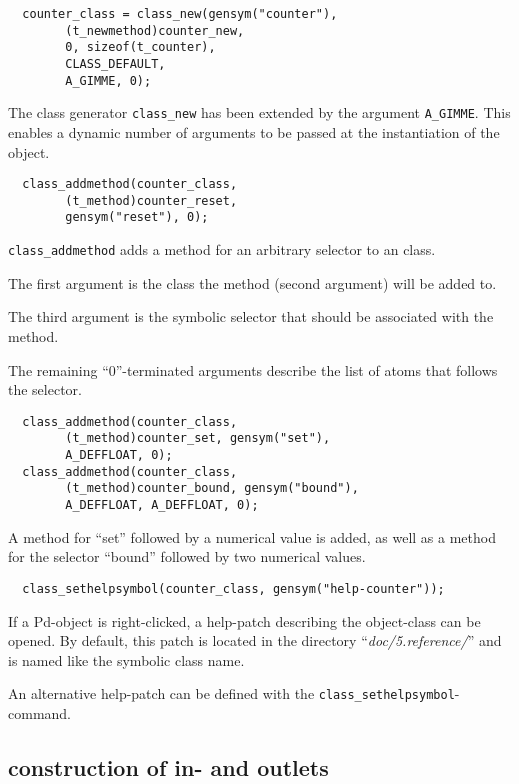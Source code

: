 \documentclass[12pt, a4paper,english,titlepage]{article}
\begin{document}
\begin{verbatim}
  counter_class = class_new(gensym("counter"),
        (t_newmethod)counter_new,
        0, sizeof(t_counter),
        CLASS_DEFAULT, 
        A_GIMME, 0);
\end{verbatim}

The class generator \verb+class_new+ has been extended by the argument \verb+A_GIMME+.
This enables a dynamic number of arguments to be passed at the instantiation of the object.

\begin{verbatim}
  class_addmethod(counter_class,
        (t_method)counter_reset,
        gensym("reset"), 0);
\end{verbatim}

\verb+class_addmethod+ adds a method for an arbitrary selector to an class.

The first argument is the class the method (second argument) will be added to.

The third argument is the symbolic selector that should be associated with the method.

The remaining ``0''-terminated arguments describe the list of atoms that
follows the selector.

\begin{verbatim}
  class_addmethod(counter_class,
        (t_method)counter_set, gensym("set"),
        A_DEFFLOAT, 0);
  class_addmethod(counter_class,
        (t_method)counter_bound, gensym("bound"),
        A_DEFFLOAT, A_DEFFLOAT, 0);
\end{verbatim}

A method for ``set'' followed by a numerical value is added,
as well as a method for the selector ``bound'' followed by two numerical values.

\begin{verbatim}
  class_sethelpsymbol(counter_class, gensym("help-counter"));
\end{verbatim}

If a Pd-object is right-clicked, a help-patch describing the object-class can be opened.
By default, this patch is located in the directory ``{\em doc/5.reference/}'' and
is named like the symbolic class name.

An alternative help-patch can be defined with the 
\verb+class_sethelpsymbol+-command.

\subsection{construction of in- and outlets}
\end{document}
